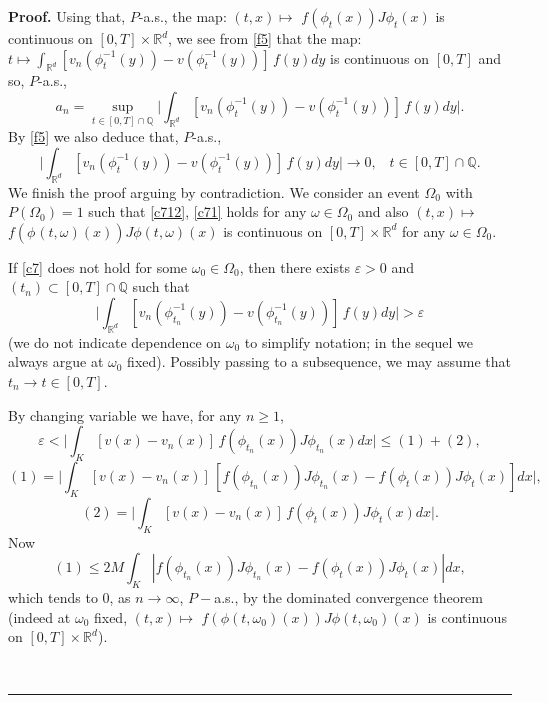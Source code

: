 \documentclass{article}
\newenvironment{proof}[1][Proof]{\noindent\textbf{#1.} }{\ \rule{0.5em}{0.5em}}
\begin{document}
\begin{proof}
Using that, $P$-a.s., the map: $(t,x) \mapsto$ $f(\phi_{t}(x)) J \phi_{t} (x)$  is continuous
on $[0,T] \times\mathbb{R}^{d}$, we see from \eqref{f5} that
 the map: $t \mapsto \int_{\mathbb{R}^{d}} [v_{n}
(\phi_{t}^{-1}( y))- v (\phi_{t}^{-1}( y))] \, f(y) dy$
is continuous on $[0,T]$ and so, $P$-a.s.,
\begin{equation}
\label{c712}
a_n = \sup_{t \in[0,T]\cap \mathbb{Q}} \Big | \int_{\mathbb{R}^{d}} [v_{n}
(\phi_{t}^{-1}( y))- v (\phi_{t}^{-1}( y))] \, f(y) dy \Big |.
\end{equation}
By \eqref{f5} we also deduce that, $P$-a.s.,
\begin{equation}
\label{c71} \Big | \int_{\mathbb{R}^{d}} [v_{n}
(\phi_{t}^{-1}( y))- v (\phi_{t}^{-1}( y))] \, f(y) dy \Big | \to 0,\;\;\; t \in [0,T] \cap \mathbb{Q}.
\end{equation}
We finish the  proof arguing by contradiction. We consider an event $\Omega_0$ with $P(\Omega_0) =1$ such that \eqref{c712}, \eqref{c71} holds for any $\omega \in \Omega_0$ and also $(t,x) \mapsto$ $f(\phi_{}(t, \omega)(x)) J \phi (t, \omega) (x)$  is continuous
on $[0,T] \times\mathbb{R}^{d}$ for any $\omega \in \Omega_0$.

If \eqref{c7}  does not hold for some $\omega_0 \in \Omega_0$, then there exists
$\varepsilon>0$ and $(t_{n}) \subset[0,T] \cap \mathbb{Q}$ such that
\[
\Big | \int_{\mathbb{R}^{d}} [v_{n} (\phi_{t_{n}}^{-1}( y))-  v (\phi_{t_{n}%
}^{-1}(y))] \, f(y) dy \Big | > \varepsilon
\]
(we do not indicate dependence on $\omega_0$ to simplify notation;  in the sequel we always argue at $\omega_0$ fixed).
Possibly passing to a subsequence, we may assume that $t_{n} \to\hat t
\in[0,T]. $

By changing variable   we have,  for any $n \ge1$,
\[
\varepsilon< \Big | \int_{K } [v (x)-  v_{n} (x)] \, f(\phi_{t_{n}}(x)) J
\phi_{t_{n}} (x) dx \Big | \le(1) + (2),
\]
\[
(1) = \Big | \int_{K } [v (x)-  v_{n} (x)] \, [f(\phi_{t_{n}}(x)) J
\phi_{t_{n}} (x) -  f(\phi_{\hat t} (x)) J \phi_{\hat t} (x) ] dx \Big |,
\]
\[
(2) = \Big | \int_{K } [v (x)-  v_{n} (x)] \,  f(\phi_{\hat t} (x)) J
\phi_{\hat t} (x) dx \Big |.
\]
Now
\[
(1) \le 2 M \int_{K } | f(\phi_{t_{n}}(x)) J \phi_{t_{n}} (x) -  f(\phi_{\hat t
}(x)) J \phi_{\hat t} (x) | dx,
\]
which tends to 0, as $n \to\infty$, ${P}-$a.s., by the dominated convergence
theorem (indeed at $\omega_0$ fixed,  $(t,x) \mapsto$ $f(\phi(t, \omega_0) (x)) J \phi ({t}, \omega_0) (x)$  is continuous
on $[0,T] \times\mathbb{R}^{d}$).


\end{proof}
\end{document}
